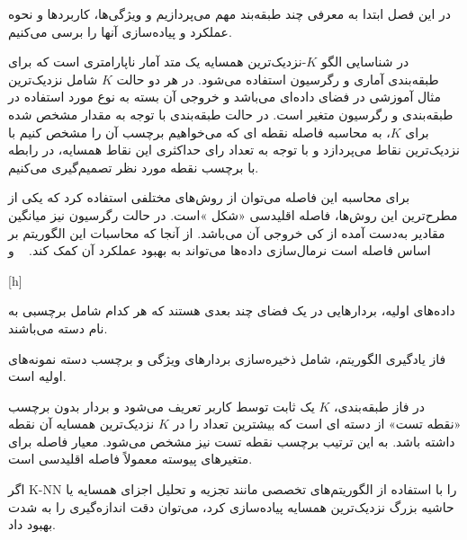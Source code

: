 در این فصل ابتدا به معرفی چند طبقه‌بند مهم می‌پردازیم و ویژگی‌ها، کاربردها و نحوه عملکرد و پیاده‌سازی آنها را برسی می‌کنیم.


در شناسایی الگو $K$-نزدیک‌ترین همسایه یک متد آمار ناپارامتری است که برای طبقه‌بندی آماری و رگرسیون استفاده می‌شود. در هر دو حالت $K$ شامل نزدیک‌ترین مثال آموزشی در فضای داده‌ای می‌باشد و خروجی آن بسته به نوع مورد استفاده در طبقه‌بندی و رگرسیون متغیر است. در حالت طبقه‌بندی با توجه به مقدار مشخص شده برای $K$، به محاسبه فاصله نقطه ای که می‌خواهیم برچسب آن را مشخص کنیم با نزدیک‌ترین نقاط می‌پردازد و با توجه به تعداد رای حداکثری این نقاط همسایه، در رابطه با برچسب نقطه مورد نظر تصمیم‌گیری می‌کنیم.

برای محاسبه این فاصله می‌توان از روش‌های مختلفی استفاده کرد که یکی از مطرح‌ترین این روش‌ها، فاصله اقلیدسی «شکل »است. در حالت رگرسیون نیز میانگین مقادیر به‌دست آمده از کی خروجی آن می‌باشد. از آنجا که محاسبات این الگوریتم بر اساس فاصله است نرمال‌سازی داده‌ها می‌تواند به بهبود عملکرد آن کمک کند. ~ و ~ 

[h]

داده‌های اولیه، بردارهایی در یک فضای چند بعدی هستند که هر کدام شامل برچسبی به نام دسته می‌باشند.

فاز یادگیری الگوریتم، شامل ذخیره‌سازی بردارهای ویژگی و برچسب دسته نمونه‌های اولیه است.

در فاز طبقه‌بندی، $K$ یک ثابت توسط کاربر تعریف می‌شود و بردار بدون برچسب «نقطه تست» از دسته ای است که بیشترین تعداد را در $K$ نزدیک‌ترین همسایه آن نقطه داشته باشد. به این ترتیب برچسب نقطه تست نیز مشخص می‌شود.
معیار فاصله برای متغیرهای پیوسته معمولاً فاصله اقلیدسی است.

اگر K-NN را با استفاده از الگوریتم‌های تخصصی مانند تجزیه و تحلیل اجزای همسایه یا حاشیه بزرگ نزدیک‌ترین همسایه پیاده‌سازی کرد، می‌توان دقت اندازه‌گیری را به شدت بهبود داد.

